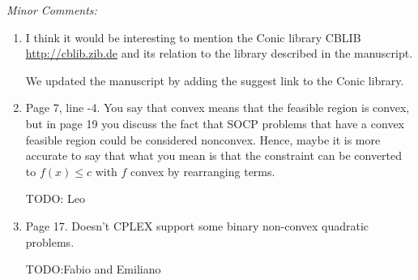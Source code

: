 \documentclass[11pt]{article}
\newcommand{\rep}[1]{{\textcolor{acblue}{#1}}}
\newcommand{\leo}[1]{{\color{red}#1}}
\begin{document}
{\it
Minor Comments:
\begin{enumerate}

\item I think it would be interesting to mention the Conic library CBLIB \url{http://cblib.zib.de} and its relation to the library described in the manuscript.

\rep{We updated the manuscript by adding the suggest link to the Conic library.}


\item Page 7, line -4. You say that convex means that the feasible region is
convex, but in page 19 you discuss the fact that SOCP problems that have
a convex feasible region could be considered nonconvex. Hence, maybe it
is more accurate to say that what you mean is that the constraint can be
converted to $f (x) \le c$ with $f$ convex by rearranging terms.

\rep{ TODO: Leo 
}

\item Page 17. Doesn't CPLEX support some binary non-convex quadratic
problems.

\rep{ TODO:Fabio and Emiliano
}


\end{enumerate}}
\end{document}
